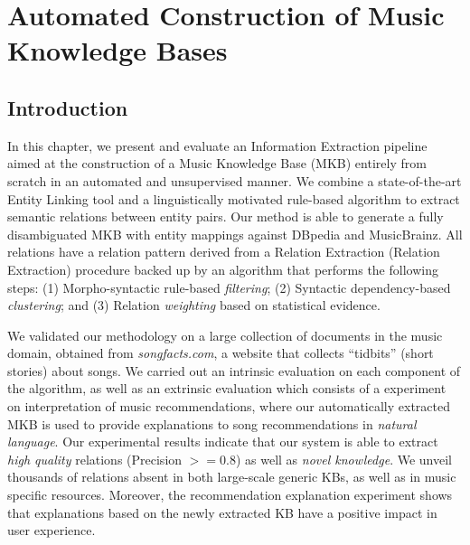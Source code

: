 
\chapter[Automated Construction of Music Knowledge Bases][Automated Construction of MKBs]{Automated Construction of Music Knowledge Bases}
\label{sec:kb}

\section{Introduction}\label{sec:kb:introduction}

In this chapter, we present and evaluate an Information Extraction pipeline aimed at the construction of a Music Knowledge Base (MKB) entirely from scratch in an automated and unsupervised manner.
We combine a state-of-the-art Entity Linking tool and a linguistically motivated rule-based algorithm to extract semantic relations between entity pairs. 
Our method is able to generate a fully disambiguated MKB with entity mappings against DBpedia and MusicBrainz. All relations have a relation pattern derived from a Relation Extraction (Relation Extraction) procedure backed up by an algorithm that performs the following steps: (1) Morpho-syntactic rule-based \textit{filtering}; (2) Syntactic dependency-based \textit{clustering}; and (3) Relation \textit{weighting} based on statistical evidence. 

We validated our methodology on a large collection of documents in the music domain, obtained from \textit{songfacts.com}, a website that collects ``tidbits'' (short stories) about songs.
We carried out an intrinsic evaluation on each component of the algorithm, as well as an extrinsic evaluation which consists of a experiment on interpretation of music recommendations, where our automatically extracted MKB is used to provide explanations to song recommendations in \textit{natural language}.
Our experimental results indicate that our system is able to extract \textit{high quality} relations (Precision $>= 0.8$) as well as \textit{novel knowledge}. We unveil thousands of relations absent in both large-scale generic KBs, as well as in music specific resources. Moreover, the recommendation explanation experiment shows that explanations based on the newly extracted KB have a positive impact in user experience.


